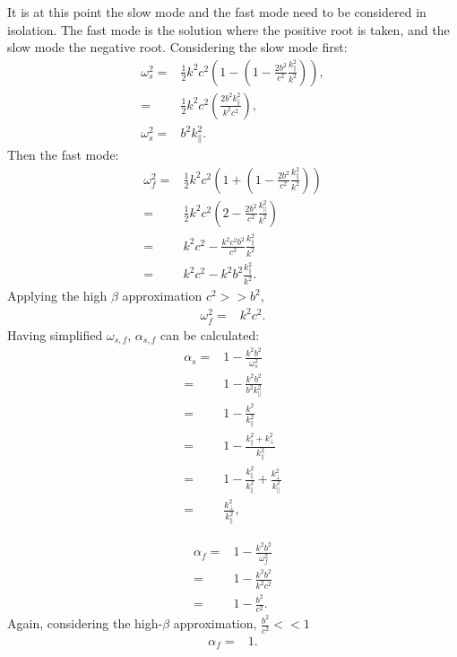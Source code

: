 It is at this point the slow mode and the fast mode need to be considered in isolation.
The fast mode is the solution where the positive root is taken, and the slow mode the negative root.
Considering the slow mode first:
\begin{align}
    \omega^2_{s} =& \frac{1}{2}k^2c^2\left(1 - \left(1 - \frac{2b^2}{c^2} \frac{k^2_\parallel}{k^2}\right)\right),\\
    =& \frac{1}{2}k^2c^2\left(\frac{2b^2k^2_\parallel}{k^2c^2}\right),\\
    \omega^2_{s} =& b^2k^2_\parallel.
\end{align}
Then the fast mode:
\begin{align}
    \omega^2_{f} =& \frac{1}{2}k^2c^2\left(1 + \left(1 - \frac{2b^2}{c^2} \frac{k^2_\parallel}{k^2}\right)\right)\\
                 =& \frac{1}{2}k^2c^2\left(2 - \frac{2b^2}{c^2} \frac{k^2_\parallel}{k^2}\right)\\
                 =& k^2c^2 - \frac{k^2c^2b^2}{c^2}\frac{k^2_\parallel}{k^2}\\
                 =& k^2c^2 - k^2b^2\frac{k^2_\parallel}{k^2}.
\end{align}
Applying the high $\beta$ approximation $c^2 >> b^2$,
\begin{align}
   \omega^2_{f} =& k^2c^2.
\end{align}
Having simplified $\omega_{s,f}$, $\alpha_{s,f}$ can be calculated:
\begin{align}
    \alpha_s =& 1 - \frac{k^2b^2}{\omega^2_s}\\
             =& 1 - \frac{k^2b^2}{b^2k_\parallel^2}\\
             =& 1 - \frac{k^2}{k_\parallel^2}\\
             =& 1 - \frac{k^2_\parallel + k^2_\perp}{k^2_\parallel}\\
             =& 1 - \frac{k_\parallel^2}{k_\parallel^2} + \frac{k^2_\perp}{k^2_\parallel}\\
             =& \frac{k^2_\perp}{k^2_\parallel},
\end{align}

\begin{align}
    \alpha_f =& 1 - \frac{k^2b^2}{\omega^2_f}\\
    =& 1 - \frac{k^2b^2}{k^2c^2}\\
    =& 1 - \frac{b^2}{c^2}.
\end{align}
Again, considering the high-$\beta$ approximation, $\displaystyle\frac{b^2}{c^2} << 1$
\begin{align}
    \alpha_f =& 1.
\end{align}

